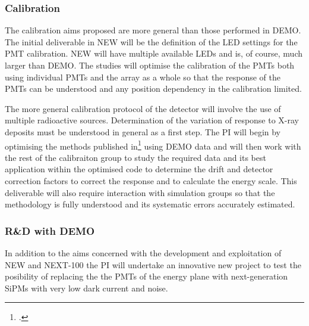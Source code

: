 \documentclass[a4paper,11pt,oneside]{article}
\begin{document}
\subsubsection*{Calibration}
The calibration aims proposed are more general than those performed in
DEMO. The initial deliverable in NEW will be the definition of the LED
settings for the PMT calibration. NEW will have multiple available
LEDs and is, of course, much larger than DEMO. The studies will
optimise the calibration of the PMTs both using individual PMTs and
the array as a whole so that the response of the PMTs can be
understood and any position dependency in the calibration limited.

The more general calibration protocol of the detector will involve the
use of multiple radioactive sources. Determination of the variation of
response to X-ray deposits must be understood in general as a first
step. The PI will begin by optimising the methods published
in\footcite{Lorca:2014sra} using DEMO data and will then work with the rest of the
calibraiton group to study the required data and its best application
within the optimised code to determine the drift and detector
correction factors to correct the response and to calculate the energy
scale. This deliverable will also require interaction with simulation
groups so that the methodology is fully understood and its systematic
errors accurately estimated.

\subsubsection*{R\&D with DEMO}
In addition to the aims concerned with the development and
exploitation of NEW and NEXT-100 the PI will undertake an innovative
new project to test the posibility of replacing the the PMTs of the
energy plane with next-generation SiPMs with very low dark current and
noise.
\end{document}
